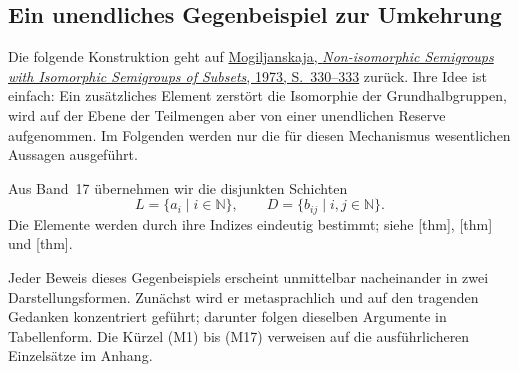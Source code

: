 \documentclass[main.tex]{subfiles}
\begin{document}
\subsection{Ein unendliches Gegenbeispiel zur Umkehrung}

Die folgende Konstruktion geht auf
\href{https://doi.org/10.1007/BF02389140}%
  {Mogiljanskaja, \emph{Non-isomorphic Semigroups with Isomorphic
  Semigroups of Subsets}, 1973, S.~330--333}
zurück. Ihre Idee ist einfach: Ein zusätzliches Element zerstört die
Isomorphie der Grundhalbgruppen, wird auf der Ebene der Teilmengen aber von
einer unendlichen Reserve aufgenommen. Im Folgenden werden nur die für diesen
Mechanismus wesentlichen Aussagen ausgeführt.

Aus Band~17 übernehmen wir die disjunkten Schichten
\[
  L=\{a_i\mid i\in\mathbb N\},
  \qquad
  D=\{b_{ij}\mid i,j\in\mathbb N\}.
\]
Die Elemente werden durch ihre Indizes eindeutig bestimmt; siehe
[thm],
[thm] und
[thm].

Jeder Beweis dieses Gegenbeispiels erscheint unmittelbar nacheinander in zwei
Darstellungsformen. Zunächst wird er metasprachlich und auf den tragenden
Gedanken konzentriert geführt; darunter folgen dieselben Argumente in
Tabellenform. Die Kürzel \textup{(M1)} bis \textup{(M17)} verweisen auf die
ausführlicheren Einzelsätze im Anhang.

\end{document}
